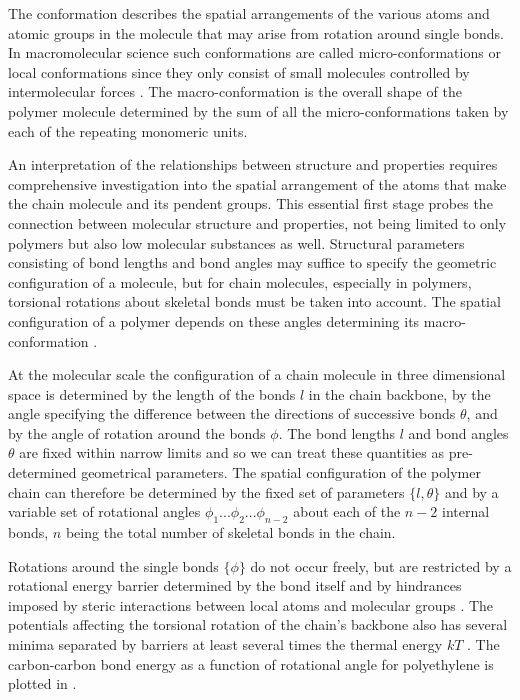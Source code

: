 The conformation describes the spatial arrangements of the various atoms and atomic groups in the molecule that may arise from  rotation around single bonds. In macromolecular science such conformations are called micro-conformations or local conformations since they only consist of small molecules controlled by intermolecular forces \cite{Flory1980,Elias1997}. The macro-conformation is the overall shape of the polymer molecule determined by the sum of all the micro-conformations taken by each of the repeating monomeric units.  

An interpretation of the relationships between structure and properties requires comprehensive investigation into the spatial arrangement of the atoms that make the chain molecule and its pendent groups. This essential first stage probes the connection between molecular structure and properties, not being limited to only polymers but also low molecular substances as well. Structural parameters consisting of bond lengths and bond angles may suffice to specify the geometric configuration of a molecule, but for chain molecules, especially in polymers, torsional rotations about skeletal bonds must be taken into account. The spatial configuration of a polymer depends on these angles determining its macro-conformation \cite{Flory1980}.  

At the molecular scale the configuration of a chain molecule in three dimensional space is determined by the length of the bonds $l$ in the chain backbone, by the angle specifying the difference between the directions of successive bonds $\theta$, and by the angle of rotation around the bonds $\phi$. The bond lengths $l$ and bond angles $\theta$ are fixed within narrow limits and so we can treat these quantities as pre-determined geometrical parameters. The spatial configuration of the polymer chain can therefore be determined by the fixed set of parameters $\{l,\theta\}$ and by a variable set of rotational angles $\phi_{1}...\phi_{2}...\phi_{n-2}$ about each of the $n-2$ internal bonds, $n$ being the total number of skeletal bonds in the chain.

Rotations around the single bonds $\{\phi\}$ do not occur freely, but are restricted by a rotational energy barrier determined by the bond itself and by hindrances imposed by steric interactions between local atoms and molecular groups \cite{Plischke2006}. The potentials affecting the torsional rotation of the chain's backbone also has several minima separated by barriers at least several times the thermal energy $kT$ \cite{Flory1980}. The carbon-carbon bond energy as a function of rotational angle for polyethylene is plotted in . 

